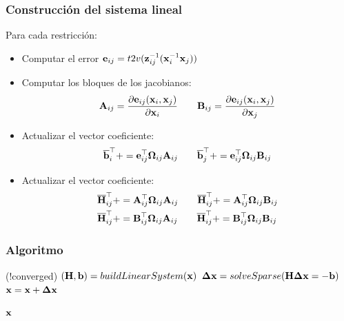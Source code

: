 \begin{frame}
	\frametitle{Construcción del sistema lineal}
	Para cada restricción:
	\begin{itemize}
		\item Computar el error $\boldsymbol{\mathbf{e}}_{ij} = t2v({\boldsymbol{\mathbf{z}}}^{-1}_{ij}({\boldsymbol{\mathbf{x}}}^{-1}_{i}\boldsymbol{\mathbf{x}}_{j}))$
		\item Computar los bloques de los jacobianos:
			\begin{equation*}
				\boldsymbol{\mathbf{A}}_{ij} = \dfrac{\partial\boldsymbol{\mathbf{e}}_{ij}(\boldsymbol{\mathbf{x}}_{i}, \boldsymbol{\mathbf{x}}_{j})}{\partial\boldsymbol{\mathbf{x}}_{i}} \quad \quad \boldsymbol{\mathbf{B}}_{ij} = \dfrac{\partial\boldsymbol{\mathbf{e}}_{ij}(\boldsymbol{\mathbf{x}}_{i}, \boldsymbol{\mathbf{x}}_{j})}{\partial\boldsymbol{\mathbf{x}}_{j}}
			\end{equation*}
	\item Actualizar el vector coeficiente:
		\begin{equation*}
			\overline{\boldsymbol{\mathbf{b}}}_{i}^{\top} += \boldsymbol{\mathbf{e}}_{ij}^{\top}\boldsymbol{\mathbf{\Omega}}_{ij}\boldsymbol{\mathbf{A}}_{ij} \quad \quad \overline{\boldsymbol{\mathbf{b}}}_{j}^{\top} += \boldsymbol{\mathbf{e}}_{ij}^{\top}\boldsymbol{\mathbf{\Omega}}_{ij}\boldsymbol{\mathbf{B}}_{ij}
		\end{equation*}

	\item Actualizar el vector coeficiente:
		\begin{align*}
			\overline{\boldsymbol{\mathbf{H}}}_{ij}^{\top} &+= \boldsymbol{\mathbf{A}}_{ij}^{\top}\boldsymbol{\mathbf{\Omega}}_{ij}\boldsymbol{\mathbf{A}}_{ij} \quad \quad \overline{\boldsymbol{\mathbf{H}}}_{ij}^{\top} += \boldsymbol{\mathbf{A}}_{ij}^{\top}\boldsymbol{\mathbf{\Omega}}_{ij}\boldsymbol{\mathbf{B}}_{ij} \\
			\overline{\boldsymbol{\mathbf{H}}}_{ij}^{\top} &+= \boldsymbol{\mathbf{B}}_{ij}^{\top}\boldsymbol{\mathbf{\Omega}}_{ij}\boldsymbol{\mathbf{A}}_{ij} \quad \quad \overline{\boldsymbol{\mathbf{H}}}_{ij}^{\top} += \boldsymbol{\mathbf{B}}_{ij}^{\top}\boldsymbol{\mathbf{\Omega}}_{ij}\boldsymbol{\mathbf{B}}_{ij}
		\end{align*}
	\end{itemize}	
	
\end{frame}

\begin{frame}
	\frametitle{Algoritmo}
	
	\begin{algorithmic}[1]
		\While (!converged)
		\State $(\boldsymbol{\mathbf{H}},\boldsymbol{\mathbf{b}}) = buildLinearSystem(\boldsymbol{\mathbf{x}})$
		\State $\boldsymbol{\mathbf{\Delta}}\boldsymbol{\mathbf{x}} = solveSparse(\boldsymbol{\mathbf{H}}\boldsymbol{\mathbf{\Delta}}\boldsymbol{\mathbf{x}} = -\boldsymbol{\mathbf{b}})$
		\State $\boldsymbol{\mathbf{x}} = \boldsymbol{\mathbf{x}} + \boldsymbol{\mathbf{\Delta}}\boldsymbol{\mathbf{x}}$
		\EndWhile

		\State \Return $\boldsymbol{\mathbf{x}}$
		\EndProcedure
	\end{algorithmic}
	
\end{frame}


